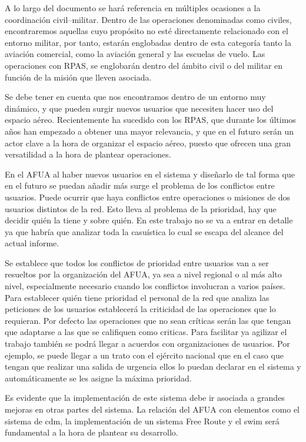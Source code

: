 A lo largo del documento se hará referencia en múltiples ocasiones a la coordinación civil–militar. Dentro de las operaciones denominadas como civiles, encontraremos aquellas cuyo propósito no esté directamente relacionado con el entorno militar, por tanto, estarán englobadas dentro de esta categoría tanto la aviación comercial, como la aviación general y las escuelas de vuelo. Las operaciones con RPAS, se englobarán dentro del ámbito civil o del militar en función de la misión que lleven asociada.

Se debe tener en cuenta que nos encontramos dentro de un entorno muy dinámico, y que pueden surgir nuevos usuarios que necesiten hacer uso del espacio aéreo. Recientemente ha sucedido con los RPAS, que durante los últimos años han empezado a obtener una mayor relevancia, y que en el futuro serán un actor clave a la hora de organizar el espacio aéreo, puesto que ofrecen una gran versatilidad a la hora de plantear operaciones.

En el AFUA al haber nuevos usuarios en el sistema y diseñarlo de tal forma que en el futuro se puedan añadir más surge el problema de los conflictos entre usuarios. Puede ocurrir que haya conflictos entre operaciones o misiones de dos usuarios distintos de la red. Esto lleva al problema de la prioridad, hay que decidir quién la tiene y sobre quién. En este trabajo no se va a entrar en detalle ya que habría que analizar toda la casuística lo cual se escapa del alcance del actual informe. 

Se establece que todos los conflictos de prioridad entre usuarios van a ser resueltos por la organización del AFUA, ya sea a nivel regional o al más alto nivel, especialmente necesario cuando los conflictos involucran a varios países. Para establecer quién tiene prioridad el personal de la red que analiza las peticiones de los usuarios establecerá la criticidad de las operaciones que lo requieran. Por defecto las operaciones que no sean críticas serán las que tengan que adaptarse a las que se califiquen como criticas. Para facilitar ya agilizar el trabajo también se podrá llegar a acuerdos con organizaciones de usuarios. Por ejemplo, se puede llegar a un trato con el ejército nacional que en el caso que tengan que realizar una salida de urgencia ellos lo puedan declarar en el sistema y automáticamente se les asigne la máxima prioridad.

Es evidente que la implementación de este sistema debe ir asociada a grandes mejoras en otras partes del sistema. La relación del AFUA con elementos como el sistema de \acrfull{cdm}, la implementación de un sistema Free Route y el \acrfull{swim} será fundamental a la hora de plantear su desarrollo. 

